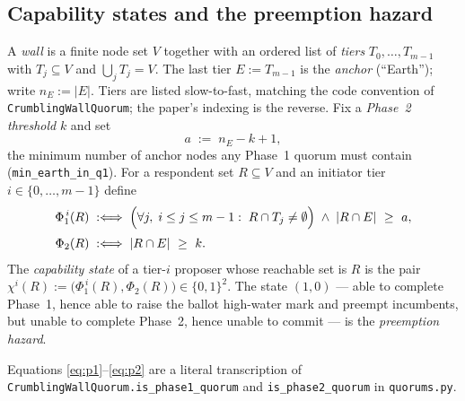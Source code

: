 
\subsection{Capability states and the preemption hazard}

\begin{definition}[Wall]
\label{def:wall}
A \emph{wall} is a finite node set $V$ together with an ordered list of
\emph{tiers} $T_0,\dots,T_{m-1}$ with $T_j\subseteq V$ and
$\bigcup_j T_j=V$.  The last tier $E:=T_{m-1}$ is the \emph{anchor}
(``Earth''); write $n_E:=|E|$.  Tiers are listed slow-to-fast, matching the
code convention of \texttt{CrumblingWallQuorum}; the paper's indexing is the
reverse.  Fix a \emph{Phase~2 threshold} $k$ and set
\[
  a \;:=\; n_E-k+1 ,
\]
the minimum number of anchor nodes any Phase~1 quorum must contain
(\texttt{min\_earth\_in\_q1}).  For a respondent set $R\subseteq V$ and an
initiator tier $i\in\{0,\dots,m-1\}$ define
\begin{align}
  \Phi_1^{\,i}(R) &\;:\Longleftrightarrow\;
    \Bigl(\forall j,\; i\le j\le m-1:\; R\cap T_j\neq\emptyset\Bigr)
    \;\wedge\; |R\cap E|\ \ge\ a ,
    \label{eq:p1}\\[2pt]
  \Phi_2(R) &\;:\Longleftrightarrow\; |R\cap E|\ \ge\ k .
    \label{eq:p2}
\end{align}
The \emph{capability state} of a tier-$i$ proposer whose reachable set is $R$
is the pair $\chi^i(R):=\bigl(\Phi_1^{\,i}(R),\Phi_2(R)\bigr)\in\{0,1\}^2$.
The state $(1,0)$ --- able to complete Phase~1, hence able to raise the ballot
high-water mark and preempt incumbents, but unable to complete Phase~2, hence
unable to commit --- is the \emph{preemption hazard}.
\end{definition}

Equations \eqref{eq:p1}--\eqref{eq:p2} are a literal transcription of
\texttt{CrumblingWallQuorum.is\_phase1\_quorum} and
\texttt{is\_phase2\_quorum} in \texttt{quorums.py}.

